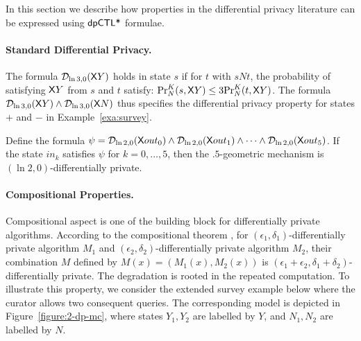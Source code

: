 In this section we describe how properties in the differential privacy literature can be expressed using $\dpCTLstar$ formulae.

\paragraph{Standard Differential Privacy.}
The formula $\dpriv{\ln 3}{0} (\X Y)$  holds in state $s$ if for  $t$ with $sNt$, the probability of satisfying $\X Y$ from $s$ and $t$ satisfy:
$\myPr{s}{K}{N}{\X Y}\le 3\myPr{t}{K}{N}{\X Y}$. The formula $\dpriv{\ln 3}{0} (\X Y)\wedge \dpriv{\ln 3}{0} (\X N)$ thus specifies the differential privacy property for states $+$ and $-$ in Example~\ref{exa:survey}.

 Define the formula
$\psi = \dpriv{\ln 2}{0} (\X out_0) \wedge \dpriv{\ln 2}{0} (\X out_1) \wedge
\cdots \wedge \dpriv{\ln 2}{0} (\X out_5)$. If the state $in_k$ satisfies
$\psi$ for $k = 0, \ldots, 5$, then the $.5$-geometric mechanism is
$(\ln 2, 0)$-differentially private.


\paragraph{Compositional Properties.}
Compositional aspect is one of the building block for differentially private algorithms. According to the compositional theorem \cite[Theorem 3.16]{DR:14:AFDP}, for $(\epsilon_1,\delta_1)$-differentially private algorithm $M_1$ and
$(\epsilon_2,\delta_2)$-differentially private algorithm $M_2$, their combination $M$ defined by $M(x)=(M_1(x), M_2(x))$ is $(\epsilon_1 + \epsilon_2,\delta_1+\delta_2)$-differentially private. The degradation is rooted in the repeated computation. To illustrate this property, we consider the extended survey example below where the curator allows two consequent queries.
The corresponding model is depicted in Figure~\ref{figure:2-dp-mc}, where states $Y_1,Y_2$ are labelled by $Y$, and $N_1,N_2$ are labelled by $N$.

